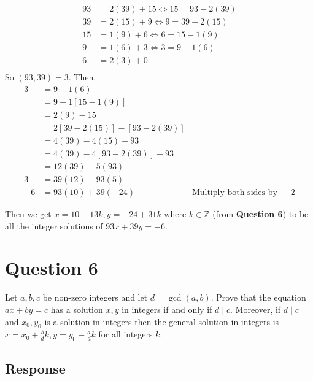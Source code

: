\documentclass[13pt]{article}
\begin{document}
\begin{align*}
  93 &= 2(39) + 15 \iff 15 = 93 - 2(39) \\
  39 &= 2(15) + 9 \iff 9 = 39 - 2(15) \\
  15 &= 1(9) + 6 \iff 6 = 15 - 1(9) \\
  9 &= 1(6) + 3 \iff 3 = 9 - 1(6)\\
  6 &= 2(3) + 0 \\
\end{align*}
So $(93, 39) = 3$.
Then,
\begin{align*}
  3 &= 9 - 1(6) \\
    &= 9 - 1[15 - 1(9)] \\
    &= 2(9) - 15 \\
    &= 2[39 - 2(15)] - [93 - 2(39)] \\
    &= 4(39) - 4(15) - 93 \\
    &= 4(39) - 4[93 - 2(39)] - 93 \\
    &= 12(39) - 5(93) \\
  3 &= 39(12) - 93(5) \\
  -6 &= 93(10) + 39(-24) & \text{Multiply both sides by } -2
\end{align*}

Then we get $x = 10 - 13k, y = -24 + 31k$ where $k \in \mathbb{Z}$ (from \textbf{Question 6}) to be
all the integer solutions of $93x + 39y = -6$.





\newpage
\section*{Question 6}
Let $a, b, c$ be non-zero integers and let $d = \gcd(a, b)$. Prove that the equation $ax + by = c$
has a solution $x, y$ in integers if and only if $d \mid c$. Moreover, if $d \mid c$ and $x_0, y_0$
is a solution in integers then the general solution in integers is $x = x_0 + \frac{b}{d}k, y = y_0
- \frac{a}{d}k$ for all integers $k$.

\subsection*{Response}
\end{document}
